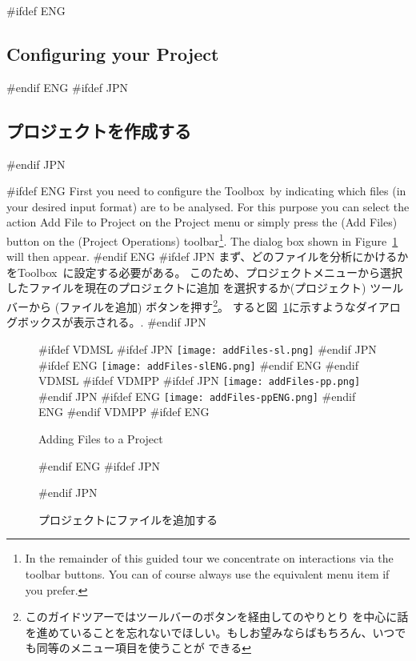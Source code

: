 \documentclass[\pformat,12pt]{article}
\newcommand{\Toolbox}{Toolbox}
\newcommand{\Toolbox}{Toolbox}
\newcommand{\guicmd}[1]{{\sf #1}}
\newcommand{\guicmd}[1]{{\gt #1}}
\begin{document}
#ifdef ENG
\subsection{Configuring your Project}
#endif ENG
#ifdef JPN
\subsection{プロジェクトを作成する}
#endif JPN

#ifdef ENG
First you need to configure the \Toolbox\ by indicating which 
files (in your desired input format) are to be analysed. For this
purpose you can select the action \guicmd{Add File to Project} on the
\guicmd{Project} menu or simply press the 
(\guicmd{Add Files}) button on the (\guicmd{Project Operations})
toolbar\footnote{In the remainder of this guided tour we concentrate
  on interactions via the toolbar buttons. You can of course always
  use the equivalent menu item if you prefer.}. The dialog box shown
in Figure~\ref{fig:addFiles} will then appear.
#endif ENG
#ifdef JPN
まず、どのファイルを分析にかけるかを\Toolbox\ に設定する必要がある。
このため、プロジェクトメニューから\guicmd{選択したファイルを現在のプロジェクトに追加} を選択するか(\guicmd{プロジェクト})
ツールバーから  
(\guicmd{ファイルを追加}) ボタンを押す\footnote{このガイドツアーではツールバーのボタンを経由してのやりとり
を中心に話を進めていることを忘れないでほしい。もしお望みならばもちろん、いつでも同等のメニュー項目を使うことが
できる}。
すると図~\ref{fig:addFiles}に示すようなダイアログボックスが表示される。.
#endif JPN

\begin{figure}[tbh]
\begin{center}
#ifdef VDMSL
#ifdef JPN
\texttt{[image: addFiles-sl.png]}
#endif JPN
#ifdef ENG
\texttt{[image: addFiles-slENG.png]}
#endif ENG
#endif VDMSL
#ifdef VDMPP
#ifdef JPN
\texttt{[image: addFiles-pp.png]}
#endif JPN
#ifdef ENG
\texttt{[image: addFiles-ppENG.png]}
#endif ENG
#endif VDMPP
#ifdef ENG
\caption{Adding Files to a Project}
#endif ENG
#ifdef JPN
\caption{プロジェクトにファイルを追加する}
#endif JPN
\label{fig:addFiles}
\end{center}
\end{figure}
\end{document}
